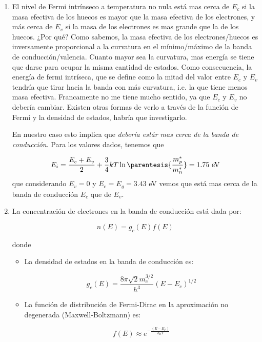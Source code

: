 	\begin{enumerate}[label=\alph*)]
		\item El nivel de Fermi intrínseco a temperatura no nula está mas cerca de $E_c$ si la masa efectiva de los huecos es mayor que la masa efectiva de los electrones, y más cerca de $E_v$ si la masa de los electrones es mas grande que la de los huecos. ¿Por qué? Como sabemos, la masa efectiva de los electrones/huecos es inversamente proporcional a la curvatura en el mínimo/máximo de la banda de conducción/valencia. Cuanto mayor sea la curvatura, mas energía se tiene que darse para ocupar la misma cantidad de estados. Como consecuencia, la energía de fermi intríseca, que se define como la mitad del valor entre $E_c$ y $E_v$ tendría que tirar hacia la banda con más curvatura, i.e. la que tiene menos masa efectiva. \textcolor{BrickRed}{Francamente no me tiene mucho sentido, ya que $E_c$ y $E_v$ no debería cambiar. Existen otras formas de verlo a través de la función de Fermi y la densidad de estados, habría que investigarlo.}

		En nuestro caso esto implica que \textit{debería estár mas cerca de la banda de conducción}. Para los valores dados, tenemos que

		\begin{equation}
		      E_i = \frac{E_c+E_v}{2} + \frac{3}{4} kT \ln\parentesis{\frac{m_p^*}{m_n^*}} = 1.75 \ \text{eV}
		\end{equation}
		que considerando $E_v=0$ y $E_c=E_g=3.43$ eV vemos que está mas cerca de la banda de conducción $E_c$ que de $E_v$.
		\item La concentración de electrones en la banda de conducción está dada por:

		      \[
			      n(E) = g_c(E) f(E)
		      \]

		      donde

		      \begin{itemize}
			      \item La densidad de estados en la banda de conducción es:

			            \[
				            g_c(E) = \frac{8\pi \sqrt{2} m_c^{3/2}}{h^3} (E - E_c)^{1/2}
			            \]

			      \item La función de distribución de Fermi-Dirac en la aproximación no degenerada (Maxwell-Boltzmann) es:

			            \[
				            f(E) \approx e^{-\frac{(E - E_F)}{k_B T}}
			            \]
		      \end{itemize}


\end{enumerate}
